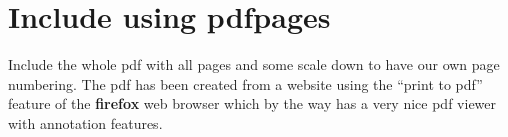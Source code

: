 \chapter{Include using pdfpages}
Include the whole pdf with all pages and some scale down to have our own page numbering.
The pdf has been created from a website using the ``print to pdf'' feature of the \textbf{firefox} web browser which by the way has a very nice pdf viewer with annotation features.
\lstset{language=[LaTeX]TeX}
\begin{lstlisting}[caption={code to include next pages as pdf}]
 
\end{lstlisting}




